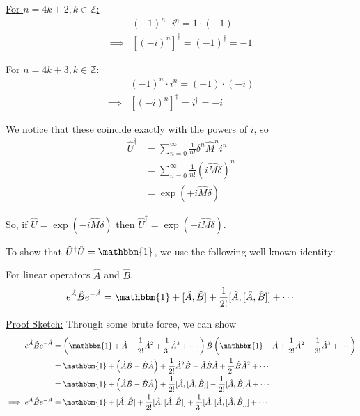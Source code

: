 \documentclass{article}
\begin{document}
\vskip 0.25cm
\underline{For $n = 4k + 2, k \in \mathbb{Z}$:}
\begin{align*}
  &(-1)^n \cdot i^n = 1 \cdot (-1) \\
  \implies &\left[(-i)^n\right]^{\dagger} = (-1)^{\dagger} = -1
\end{align*}

\vskip 0.25cm
\underline{For $n = 4k + 3, k \in \mathbb{Z}$:}
\begin{align*}
  &(-1)^n \cdot i^n = (-1) \cdot (-i) \\
  \implies &\left[(-i)^n\right]^{\dagger} = i^{\dagger} = -i
\end{align*}

\vskip 0.5cm
We notice that these coincide exactly with the powers of $i$, so 
\begin{align*}
  \hat{U}^{\dagger} &= \sum_{n = 0}^{\infty} \frac{1}{n!} \delta^n \hat{M}^n i^n \\
  &= \sum_{n = 0}^{\infty} \frac{1}{n!} \left( i\hat{M} \delta \right)^n \\
  &= \exp\left( +i \hat{M} \delta \right)
\end{align*}

So, if $\hat{U} = \exp(-i \hat{M} \delta)$ then $\hat{U}^{\dagger} = \exp(+i \hat{M} \delta)$. 

\vskip 0.5cm
To show that $\hat{U}^{\dagger} \hat{U} = \mathbbm{1}$, we use the following well-known identity:

\begin{dottedbox}
  For linear operators $\hat{A}$ and $\hat{B}$,
  \[ e^{\hat{A}} \hat{B} e^{-\hat{A}} = \mathbbm{1} + [\hat{A}, \hat{B}] + \frac{1}{2!} [\hat{A}, [\hat{A}, \hat{B}]] + \cdots \]

  \vskip 0.5cm
  \underline{Proof Sketch:}
  Through some brute force, we can show 
  \begin{align*}
    e^{\hat{A}} \hat{B} e^{-\hat{A}} &= \left( \mathbbm{1} + \hat{A} + \frac{1}{2!} \hat{A}^2 + \frac{1}{3!} \hat{A}^3 + \cdots \right) \hat{B} \left(\mathbbm{1} - \hat{A} + \frac{1}{2!} \hat{A}^2 - \frac{1}{3!} \hat{A}^3 + \cdots  \right) \\
    &= \mathbbm{1} + \left( \hat{A}\hat{B} - \hat{B}\hat{A} \right) + \frac{1}{2!}\hat{A}^2 \hat{B} - \hat{A}\hat{B}\hat{A} + \frac{1}{2!}\hat{B}\hat{A}^2 + \cdots \\
    &= \mathbbm{1} + \left( \hat{A}\hat{B} - \hat{B}\hat{A} \right) + \frac{1}{2!}[\hat{A}, [\hat{A}, \hat{B}]] - \frac{1}{2!} [\hat{A}, \hat{B}]\hat{A} + \cdots \\
    \implies e^{\hat{A}} \hat{B} e^{-\hat{A}} &= \mathbbm{1} + [\hat{A}, \hat{B}] + \frac{1}{2!}[\hat{A}, [\hat{A}, \hat{B}]] + \frac{1}{3!}[\hat{A}, [\hat{A}, [\hat{A}, \hat{B}]]] + \cdots
  \end{align*}
\end{dottedbox}
\end{document}
